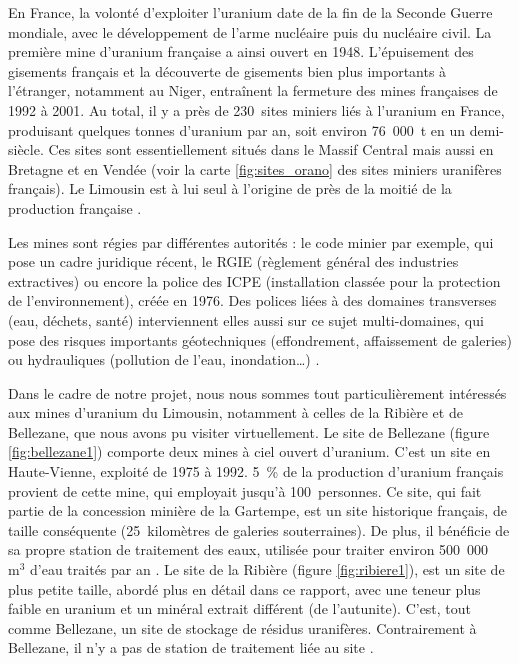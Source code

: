 \documentclass{article}
\begin{document}

En France, la volonté d’exploiter l’uranium date de la fin de la Seconde Guerre mondiale, avec le développement de l'arme nucléaire puis du nucléaire civil. La première mine d’uranium française a ainsi ouvert en 1948. L’épuisement des gisements français et la découverte de gisements bien plus importants à l’étranger, notamment au Niger, entraînent la fermeture des mines françaises de 1992 à 2001. Au total, il y a près de 230~sites miniers liés à l’uranium en France, produisant quelques tonnes d'uranium par an, soit environ 76~000~t en un demi-siècle. Ces sites sont essentiellement situés dans le Massif Central mais aussi en Bretagne et en Vendée (voir la carte \ref{fig:sites_orano} des sites miniers uranifères français). Le Limousin est à lui seul à l’origine de près de la moitié de la production française \cite{descostes_introduction_2020}.

Les mines sont régies par différentes autorités : le code minier par exemple, qui pose un cadre juridique récent, le RGIE (règlement général des industries extractives) ou encore la police des ICPE (installation classée pour la protection de l’environnement), créée en 1976. Des polices liées à des domaines transverses (eau, déchets, santé) interviennent elles aussi sur ce sujet multi-domaines, qui pose des risques importants géotechniques (effondrement, affaissement de galeries) ou hydrauliques (pollution de l'eau, inondation…) \cite{dublineau_gestion_2020}\cite{ledoux_notions_2020}\cite{raimbault_mine_2020}.

Dans le cadre de notre projet, nous nous sommes tout particulièrement intéressés aux mines d'uranium du Limousin, notamment à celles de la Ribière et de Bellezane, que nous avons pu visiter virtuellement. Le site de Bellezane (figure \ref{fig:bellezane1}) comporte deux mines à ciel ouvert d'uranium. C’est un site en Haute-Vienne, exploité de 1975 à 1992. 5~\% de la production d’uranium français provient de cette mine, qui employait jusqu’à 100~personnes. Ce site, qui fait partie de la concession minière de la Gartempe, est un site historique français, de taille conséquente (25~kilomètres de galeries souterraines). De plus, il bénéficie de sa propre station de traitement des eaux, utilisée pour traiter environ 500~000~$\text{m}^3$ d’eau traités par an \cite{benesteau_site_2020}. Le site de la Ribière (figure \ref{fig:ribiere1}), est un site de plus petite taille, abordé plus en détail dans ce rapport, avec une teneur plus faible en uranium et un minéral extrait différent (de l’autunite). C’est, tout comme Bellezane, un site de stockage de résidus uranifères. Contrairement à Bellezane, il n’y a pas de station de traitement liée au site \cite{descostes_introduction_2020}.
\end{document}

